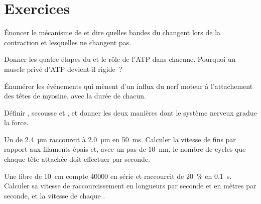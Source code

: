 \section{Exercices}

\begin{exercise}[$\star$]\label{exo:b2:muscle-movement:1}
Énoncer le mécanisme de  et dire quelles bandes
du  changent lors de la contraction et lesquelles ne changent
pas.
\end{exercise}

\begin{exercise}[$\star$]\label{exo:b2:muscle-movement:2}
Donner les quatre étapes du  et le rôle de l'ATP
dans chacune. Pourquoi un muscle privé d'ATP devient-il rigide~?
\end{exercise}

\begin{exercise}[$\star$]\label{exo:b2:muscle-movement:3}
Énumérer les événements qui mènent d'un influx du nerf moteur à
l'attachement des têtes de myosine, avec la durée de chacun.
\end{exercise}

\begin{exercise}[$\star$]\label{exo:b2:muscle-movement:4}
Définir , secousse et , et donner les deux manières
dont le système nerveux gradue la force.
\end{exercise}

\begin{exercise}[$\star\star$]\label{exo:b2:muscle-movement:5}
Un  de \qty{2.4}{\micro m} raccourcit à \qty{2.0}{\micro m} en
\qty{50}{ms}. Calculer la vitesse de  fins par
rapport aux filaments épais et, avec un pas de \qty{10}{nm}, le nombre
de cycles que chaque tête attachée doit effectuer par seconde.
\end{exercise}

\begin{exercise}[$\star\star$]\label{exo:b2:muscle-movement:6}
Une fibre de \qty{10}{cm} compte \num{40000}  en série et
raccourcit de \qty{20}{\%} en \qty{0.1}{s}. Calculer sa vitesse de
raccourcissement en longueurs par seconde et en mètres par seconde, et
la vitesse de chaque .
\end{exercise}

